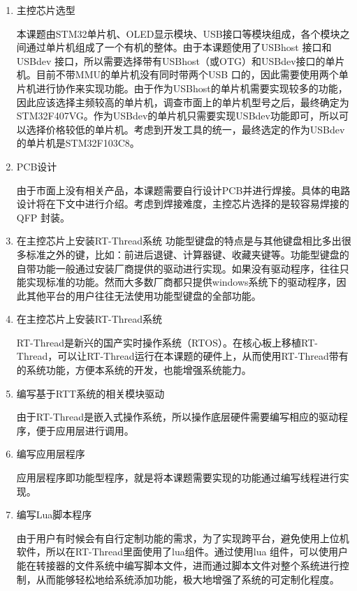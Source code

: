 \begin{enumerate}
\item 主控芯片选型

本课题由STM32单片机、OLED显示模块、USB接口等模块组成，各个模块之间通过单片机组成了一个有机的整体。由于本课题使用了USBhost 接口和USBdev 接口，所以需要选择带有USBhost（或OTG）和USBdev接口的单片机。目前不带MMU的单片机没有同时带两个USB 口的，因此需要使用两个单片机进行协作来实现功能。由于作为USBhost的单片机需要实现较多的功能，因此应该选择主频较高的单片机，调查市面上的单片机型号之后，最终确定为STM32F407VG。作为USBdev的单片机只需要实现USBdev功能即可，所以可以选择价格较低的单片机。考虑到开发工具的统一，最终选定的作为USBdev的单片机是STM32F103C8。


\item PCB设计

由于市面上没有相关产品，本课题需要自行设计PCB并进行焊接。具体的电路设计将在下文中进行介绍。考虑到焊接难度，主控芯片选择的是较容易焊接的QFP 封装。


\item 在主控芯片上安装RT-Thread系统
功能型键盘的特点是与其他键盘相比多出很多标准之外的键，比如：前进后退键、计算器键、收藏夹键等。功能型键盘的自带功能一般通过安装厂商提供的驱动进行实现。如果没有驱动程序，往往只能实现标准的功能。然而大多数厂商都只提供windows系统下的驱动程序，因此其他平台的用户往往无法使用功能型键盘的全部功能。


\item 在主控芯片上安装RT-Thread系统

RT-Thread是新兴的国产实时操作系统（RTOS）。在核心板上移植RT-Thread，可以让RT-Thread运行在本课题的硬件上，从而使用RT-Thread带有的系统功能，方便本系统的开发，也能增强系统能力。

\item 编写基于RTT系统的相关模块驱动

由于RT-Thread是嵌入式操作系统，所以操作底层硬件需要编写相应的驱动程序，便于应用层进行调用。

\item 编写应用层程序

应用层程序即功能型程序，就是将本课题需要实现的功能通过编写线程进行实现。


\item 编写Lua脚本程序

由于用户有时候会有自行定制功能的需求，为了实现跨平台，避免使用上位机软件，所以在RT-Thread里面使用了lua组件。通过使用lua 组件，可以使用户能在转接器的文件系统中编写脚本文件，进而通过脚本文件对整个系统进行控制，从而能够轻松地给系统添加功能，极大地增强了系统的可定制化程度。

\end{enumerate}


